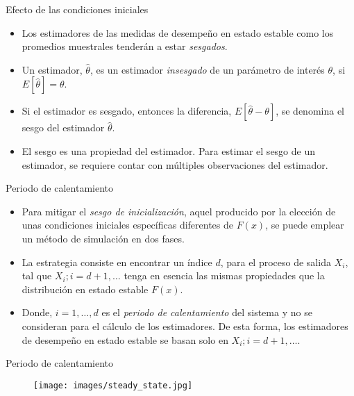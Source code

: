 \begin{frame}{Efecto de las condiciones iniciales}
    \begin{itemize}
        \item Los estimadores de las medidas de desempeño en estado estable como los promedios muestrales tenderán a estar \textit{sesgados}. 
        \item Un estimador, $\hat{\theta}$, es un estimador \textit{insesgado} de un parámetro de interés $\theta$, si $E[\hat{\theta}]=\theta$.
        \item Si el estimador es sesgado, entonces la diferencia, $E[\hat{\theta}-\theta]$, se denomina el sesgo del estimador $\hat{\theta}$.
        \item El sesgo es una propiedad del estimador. Para estimar el sesgo de un estimador, se requiere contar con múltiples observaciones del estimador.
    \end{itemize}
\end{frame}

\begin{frame}{Periodo de calentamiento}
    \begin{itemize}
        \item Para mitigar el \textit{sesgo de inicialización}, aquel producido por la elección de unas condiciones iniciales específicas diferentes de $F(x)$, se puede emplear un método de simulación en dos fases.%
        \item La estrategia consiste en encontrar un índice $d$, para el proceso de salida $X_i$, tal que $X_i; i=d+1, \dots$ tenga en esencia las mismas propiedades que la distribución en estado estable $F(x)$.
        \item Donde, $i=1,\dots, d$ es el \textit{periodo de calentamiento} del sistema y no se consideran para el cálculo de los estimadores. De esta forma, los estimadores de desempeño en estado estable se basan solo en $X_i;i=d+1, \dots$. 
    \end{itemize}
\end{frame}

\begin{frame}{Periodo de calentamiento}
    \begin{figure}
        \centering
        \texttt{[image: images/steady\_state.jpg]}
    \end{figure}
\end{frame}

